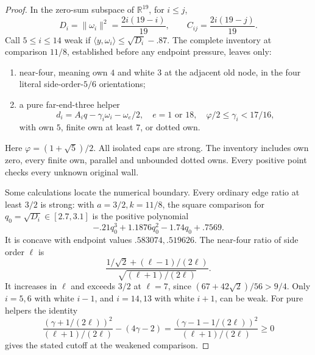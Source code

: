 \documentclass[11pt]{article}
\theoremstyle{definition}
\theoremstyle{remark}
\newcommand{\R}{\mathbb R}
\newcommand{\ip}[2]{\langle #1,#2\rangle}
\newcommand{\norm}[1]{\lVert #1\rVert}
\begin{document}
\begin{proof}
In the zero-sum subspace of \(\R^{19}\), for \(i\leq j\),
\[
 D_i=\norm{\omega_i}^2=\frac{2i(19-i)}{19},\qquad
 C_{ij}=\frac{2i(19-j)}{19}.
\]
Call \(5\leq i\leq14\) weak if
\(\ip{y}{\omega_i}\leq\sqrt{D_i}-.87\).
The complete inventory at comparison \(11/8\), established
before any endpoint pressure, leaves only:
\begin{enumerate}[label=(\alph*)]
\item near-four, meaning own \(4\) and white \(3\) at the adjacent
 old node, in the four literal side-order-\(5/6\) orientations;
\item a pure far-end-three helper
\[
 d_i=A_iq-\gamma_i\omega_i-\omega_e/2,\quad
 e=1\text{ or }18,\quad
 \varphi/2\leq\gamma_i<17/16,
\]
 with own \(5\), finite own at least \(7\), or dotted own.
\end{enumerate}
Here \(\varphi=(1+\sqrt5)/2\).
All isolated caps are strong. The inventory includes own zero,
every finite own, parallel and unbounded dotted owns.
Every positive point checks every unknown original wall.

Some calculations locate the numerical boundary.
Every ordinary edge ratio at least \(3/2\) is strong:
with \(a=3/2,k=11/8\), the square comparison for
\(q_0=\sqrt{D_i}\in[2.7,3.1]\) is the positive polynomial
\[
 -.21q_0^3+1.1876q_0^2-1.74q_0+.7569.
\]
It is concave with endpoint values \(.583074,.519626\).
The near-four ratio of side order \(\ell\) is
\[
 \frac{1/\sqrt2+(\ell-1)/(2\ell)}
      {\sqrt{(\ell+1)/(2\ell)}}.
\]
It increases in \(\ell\) and exceeds \(3/2\) at \(\ell=7\),
since \((67+42\sqrt2)/56>9/4\). Only \(i=5,6\) with white
\(i-1\), and \(i=14,13\) with white \(i+1\), can be weak.
For pure helpers the identity
\[
 \frac{(\gamma+1/(2\ell))^2}{(\ell+1)/(2\ell)}
 -(4\gamma-2)
 =\frac{(\gamma-1-1/(2\ell))^2}{(\ell+1)/(2\ell)}\geq0
\]
gives the stated cutoff at the weakened comparison.


\end{proof}
\end{document}
